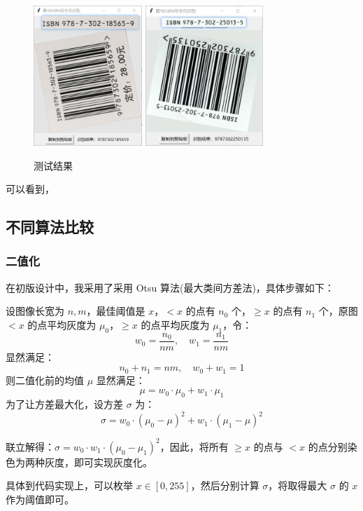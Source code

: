 \documentclass{ctexart}
\begin{document}
\begin{figure}[H]
    \includegraphics[height=150pt]{test_11}\quad
    \includegraphics[height=150pt]{test_12}
    \caption{测试结果}
\end{figure}


可以看到，


\subsection{不同算法比较}

\subsubsection{二值化}
在初版设计中，我采用了采用 Otsu 算法(最大类间方差法)，具体步骤如下：

设图像长宽为 $n,m$，最佳阈值是 $x$，$< x$ 的点有 $n_0$ 个，$\ge x$ 的点有 $n_1$ 个，原图 $< x$ 的点平均灰度为 $\mu_0$，$\ge x$ 的点平均灰度为 $\mu_1$，令：
\[w_0=\frac{n_0}{nm},\quad w_1=\frac{n_1}{nm}\]
显然满足：
\[n_0+n_1=nm,\quad w_0+w_1=1\]
则二值化前的均值 $\mu$ 显然满足：
\[\mu=w_0\cdot\mu_0+w_1\cdot\mu_1\]
为了让方差最大化，设方差 $\sigma$ 为：
\[\sigma=w_0\cdot(\mu_0-\mu)^2+w_1\cdot(\mu_1-\mu)^2\]

联立解得：$\sigma=w_0\cdot w_1\cdot (\mu_0-\mu_1)^2$，因此，将所有 $\ge x$ 的点与 $< x$ 的点分别染色为两种灰度，即可实现灰度化。

具体到代码实现上，可以枚举 $x\in[0,255]$，然后分别计算 $\sigma$，将取得最大 $\sigma$ 的 $x$ 作为阈值即可。
\end{document}
